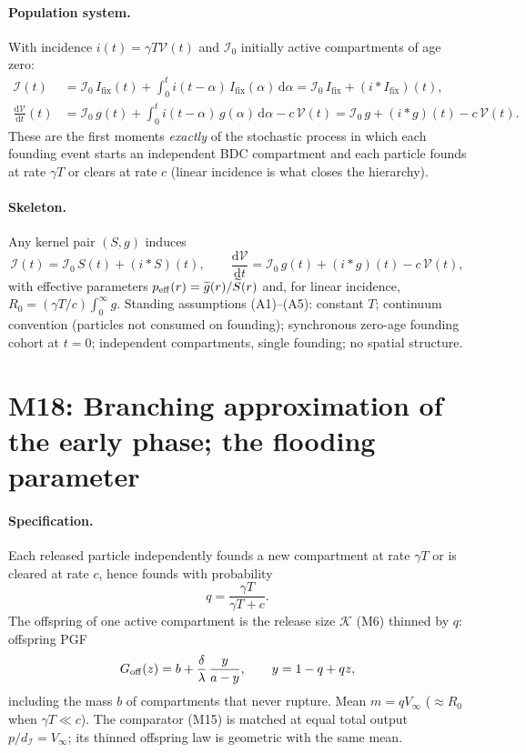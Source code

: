 \documentclass[11pt,a4paper]{report}
\newcommand{\dd}{\mathrm{d}}
\newcommand{\ddt}[1]{\frac{\dd #1}{\dd t}}
\newcommand{\Ifix}{I_{\mathrm{fix}}}
\newcommand{\Kr}{\mathcal{K}}      %
\newcommand{\Act}{\mathcal{I}}     %
\newcommand{\Free}{\mathcal{V}}    %
\newcommand{\Lap}[1]{\widetilde{#1}}
\newcommand{\source}[1]{\par\noindent{\small\textit{Specified in #1.}}\par\medskip}
\begin{document}
\paragraph{Population system.} With incidence $i(t)=\gamma T\Free(t)$ and
$\Act_0$ initially active compartments of age zero:
\begin{align}
\Act(t)&=\Act_0\,\Ifix(t)+\int_0^t i(t-\alpha)\,\Ifix(\alpha)\,\dd\alpha
=\Act_0\,\Ifix+(i*\Ifix)(t),\\
\ddt{\Free}(t)
&=\Act_0\,g(t)+\int_0^t i(t-\alpha)\,g(\alpha)\,\dd\alpha-c\,\Free(t)
=\Act_0\,g+(i*g)(t)-c\,\Free(t).
\end{align}
These are the first moments \emph{exactly} of the stochastic process in
which each founding event starts an independent BDC compartment and each
particle founds at rate $\gamma T$ or clears at rate $c$ (linear incidence
is what closes the hierarchy).

\paragraph{Skeleton.} Any kernel pair $(S,g)$ induces
\begin{equation}
\Act(t)=\Act_0\,S(t)+(i*S)(t),
\qquad
\ddt{\Free}=\Act_0\,g(t)+(i*g)(t)-c\,\Free(t),
\end{equation}
with effective parameters $p_{\rm eff}(r)=\Lap{g}(r)/\Lap{S}(r)$ and, for
linear incidence, $R_0=(\gamma T/c)\int_0^\infty g$. Standing assumptions
(A1)--(A5): constant $T$; continuum convention (particles not consumed on
founding); synchronous zero-age founding cohort at $t=0$; independent
compartments, single founding; no spatial structure.

\section{M18: Branching approximation of the early phase; the flooding parameter}
\source{\S6.6.1--6.6.2}

\paragraph{Specification.} Each released particle independently founds a
new compartment at rate $\gamma T$ or is cleared at rate $c$, hence founds
with probability
\begin{equation}
q=\frac{\gamma T}{\gamma T+c}.
\end{equation}
The offspring of one active compartment is the release size $\Kr$ (M6)
thinned by $q$: offspring PGF
\begin{equation}
G_{\rm off}(z)=b+\frac{\delta}{\lambda}\,\frac{y}{a-y},
\qquad y=1-q+qz,
\end{equation}
including the mass $b$ of compartments that never rupture. Mean
$m=qV_\infty$ ($\approx R_0$ when $\gamma T\ll c$). The comparator (M15)
is matched at equal total output $p/d_{\Act}=V_\infty$; its thinned
offspring law is geometric with the same mean.
\end{document}
